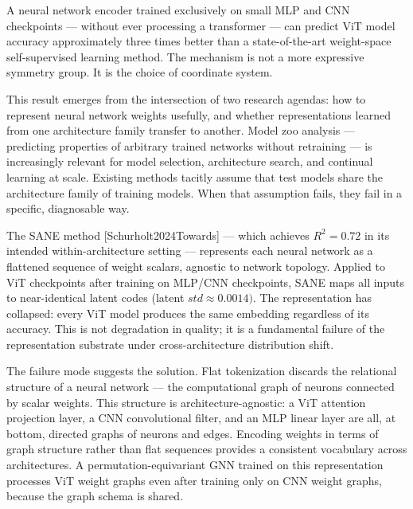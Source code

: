 
A neural network encoder trained exclusively on small MLP and CNN checkpoints --- without ever processing a transformer --- can predict ViT model accuracy approximately three times better than a state-of-the-art weight-space self-supervised learning method. The mechanism is not a more expressive symmetry group. It is the choice of coordinate system.

This result emerges from the intersection of two research agendas: how to represent neural network weights usefully, and whether representations learned from one architecture family transfer to another. Model zoo analysis --- predicting properties of arbitrary trained networks without retraining --- is increasingly relevant for model selection, architecture search, and continual learning at scale. Existing methods tacitly assume that test models share the architecture family of training models. When that assumption fails, they fail in a specific, diagnosable way.

The SANE method [Schurholt2024Towards] --- which achieves $R^{2}=0.72$ in its intended within-architecture setting --- represents each neural network as a flattened sequence of weight scalars, agnostic to network topology. Applied to ViT checkpoints after training on MLP/CNN checkpoints, SANE maps all inputs to near-identical latent codes (latent $std\approx 0.0014)$. The representation has collapsed: every ViT model produces the same embedding regardless of its accuracy. This is not degradation in quality; it is a fundamental failure of the representation substrate under cross-architecture distribution shift.

The failure mode suggests the solution. Flat tokenization discards the relational structure of a neural network --- the computational graph of neurons connected by scalar weights. This structure is architecture-agnostic: a ViT attention projection layer, a CNN convolutional filter, and an MLP linear layer are all, at bottom, directed graphs of neurons and edges. Encoding weights in terms of graph structure rather than flat sequences provides a consistent vocabulary across architectures. A permutation-equivariant GNN trained on this representation processes ViT weight graphs even after training only on CNN weight graphs, because the graph schema is shared.

